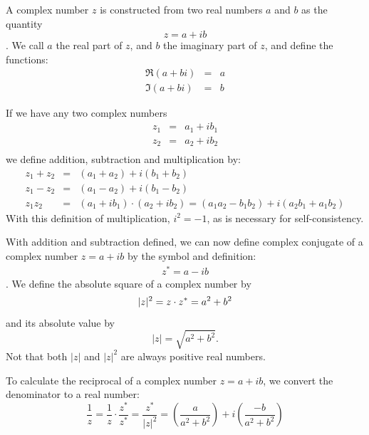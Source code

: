 \documentclass[12pt]{article}
\begin{document}
A complex number $z$ is constructed from two real numbers $a$ and $b$ as the quantity
\begin{equation} \label{eqn:complex}
z = a + i b 
\end{equation}.
We call $a$ the real part of $z$, and $b$ the imaginary part of $z$, and define the functions:
\begin{eqnarray*}
\Re(a + bi) & = & a \\
\Im(a + bi) & = & b
\end{eqnarray*}

If we have any two complex numbers
\begin{eqnarray*}
z_1 & = &  a_1 + i b_1 \\
z_2 & = &  a_2 + i b_2 \\
\end{eqnarray*}
we define addition, subtraction and multiplication by:
\begin{eqnarray*}
z_1 + z_2 & = &  (a_1 + a_2)+ i (b_1 + b_2) \\
z_1 - z_2 & = &  (a_1 - a_2)+ i (b_1 - b_2) \\
z_1 z_2 & = &  (a_1 + i b_1) \cdot (a_2 + i b_2)  = (a_1 a_2 - b_1 b_2) + i(a_2 b_1 + a_1 b_2)
\end{eqnarray*}
With this definition of multiplication, $i^2 = -1$, as is necessary for self-consistency.

With addition and subtraction defined, we can now define complex conjugate of a complex number $z = a+ib$ by the symbol and definition:
\begin{eqnarray*}
z^* = a - i b
\end{eqnarray*}.  
We define the absolute square of a complex number by
\begin{equation*}
|z|^2  =  z \cdot z^* = a^2 + b^2 \\
\end{equation*}
and its absolute value by
\begin{equation*}
|z|  =  \sqrt{a^2 + b^2}.
\end{equation*}  
Not that both $|z|$ and $|z|^2$ are always positive real numbers.

To calculate the reciprocal of a complex number $z = a+ib$, we convert the denominator to a real number:
\begin{equation*}
\frac{1}{z} = \frac{1}{z} \cdot \frac{z^*}{z^*} = \frac{z^*}{|z|^2} = \left( \frac{a}{a^2+b^2} \right) + i \left( \frac{-b}{a^2+b^2}\right)
\end{equation*}
\end{document}
